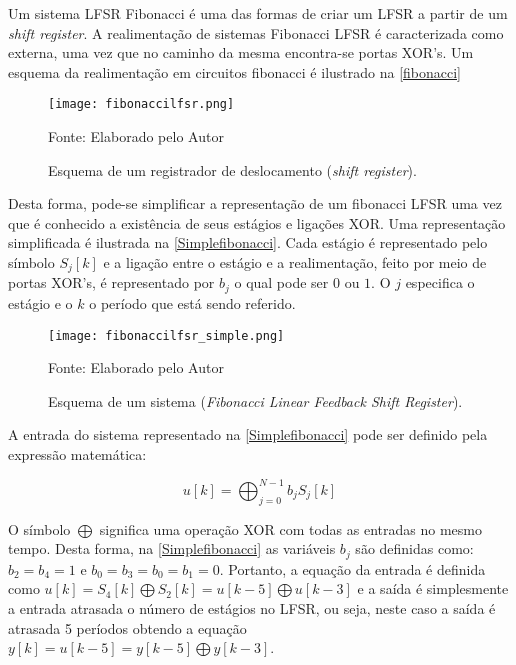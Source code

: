 Um sistema LFSR Fibonacci é uma das formas de criar um LFSR a partir de um \textit{shift register}. A realimentação de sistemas Fibonacci LFSR é caracterizada como externa, uma vez que no caminho da mesma encontra-se portas XOR's. Um esquema da realimentação em circuitos fibonacci é ilustrado na \autoref{fibonacci}

\begin{figure}[H]
	\caption{\label{fibonacci}Esquema de um registrador de deslocamento (\textit{shift register}).}
	\centering
	\texttt{[image: fibonaccilfsr.png]}
	\begin{center}
		Fonte: Elaborado pelo Autor
	\end{center}	
\end{figure}

Desta forma, pode-se simplificar a representação de um fibonacci LFSR uma vez que é conhecido a existência de seus estágios e ligações XOR. Uma representação simplificada é ilustrada na \autoref{Simplefibonacci}. Cada estágio é representado pelo símbolo $ S_{j}[k]$ e a ligação entre o estágio e a realimentação, feito por meio de portas XOR's, é representado por $b_{j}$ o qual pode ser $0$ ou $1$. O $j$ especifica o estágio e o $k$ o período que está sendo referido.

\begin{figure}[H]
	\caption{\label{Simplefibonacci}Esquema de um sistema (\textit{Fibonacci Linear Feedback Shift Register}).}
	\centering
	\texttt{[image: fibonaccilfsr\_simple.png]}
	\begin{center}
		Fonte: Elaborado pelo Autor
	\end{center}	
\end{figure}

A entrada do sistema representado na \autoref{Simplefibonacci} pode ser definido pela expressão matemática:

$$ u[k] = \bigoplus_{j = 0}^{N - 1} b_{j}S_{j}[k] $$

O símbolo $ \bigoplus $ significa uma operação XOR com todas as entradas no mesmo tempo. Desta forma, na \autoref{Simplefibonacci} as variáveis $ b_{j} $ são definidas como: $ b_{2} = b_{4} = 1 $ e $ b_{0} = b_{3} = b_{0} = b_{1} = 0 $. Portanto, a equação da entrada é definida como $ u[k] = S_{4}[k] \bigoplus S_{2}[k] = u[k-5] \bigoplus u[k-3] $ e a saída é simplesmente a entrada atrasada o número de estágios no LFSR, ou seja, neste caso a saída é atrasada 5 períodos obtendo a equação $y[k] = u[k-5] = y[k-5] \bigoplus y[k-3] $. 

